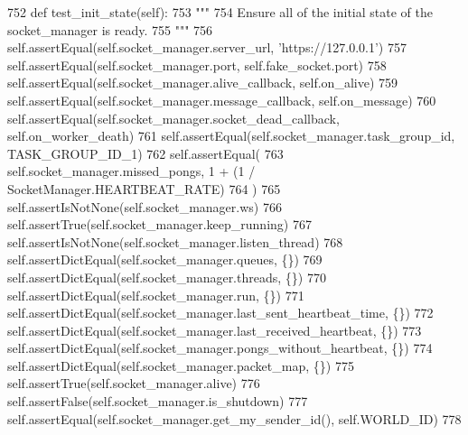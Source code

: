 \begin{DoxyCode}
752     \textcolor{keyword}{def }test\_init\_state(self):
753         \textcolor{stringliteral}{"""}
754 \textcolor{stringliteral}{        Ensure all of the initial state of the socket\_manager is ready.}
755 \textcolor{stringliteral}{        """}
756         self.assertEqual(self.socket\_manager.server\_url, \textcolor{stringliteral}{'https://127.0.0.1'})
757         self.assertEqual(self.socket\_manager.port, self.fake\_socket.port)
758         self.assertEqual(self.socket\_manager.alive\_callback, self.on\_alive)
759         self.assertEqual(self.socket\_manager.message\_callback, self.on\_message)
760         self.assertEqual(self.socket\_manager.socket\_dead\_callback, self.on\_worker\_death)
761         self.assertEqual(self.socket\_manager.task\_group\_id, TASK\_GROUP\_ID\_1)
762         self.assertEqual(
763             self.socket\_manager.missed\_pongs, 1 + (1 / SocketManager.HEARTBEAT\_RATE)
764         )
765         self.assertIsNotNone(self.socket\_manager.ws)
766         self.assertTrue(self.socket\_manager.keep\_running)
767         self.assertIsNotNone(self.socket\_manager.listen\_thread)
768         self.assertDictEqual(self.socket\_manager.queues, \{\})
769         self.assertDictEqual(self.socket\_manager.threads, \{\})
770         self.assertDictEqual(self.socket\_manager.run, \{\})
771         self.assertDictEqual(self.socket\_manager.last\_sent\_heartbeat\_time, \{\})
772         self.assertDictEqual(self.socket\_manager.last\_received\_heartbeat, \{\})
773         self.assertDictEqual(self.socket\_manager.pongs\_without\_heartbeat, \{\})
774         self.assertDictEqual(self.socket\_manager.packet\_map, \{\})
775         self.assertTrue(self.socket\_manager.alive)
776         self.assertFalse(self.socket\_manager.is\_shutdown)
777         self.assertEqual(self.socket\_manager.get\_my\_sender\_id(), self.WORLD\_ID)
778 
\end{DoxyCode}
\mbox{\label{classparlai_1_1mturk_1_1core_1_1test_1_1test__socket__manager_1_1TestSocketManagerRoutingFunctionality_acb247f8dc2442912c07558f3f7764ba0}} 
